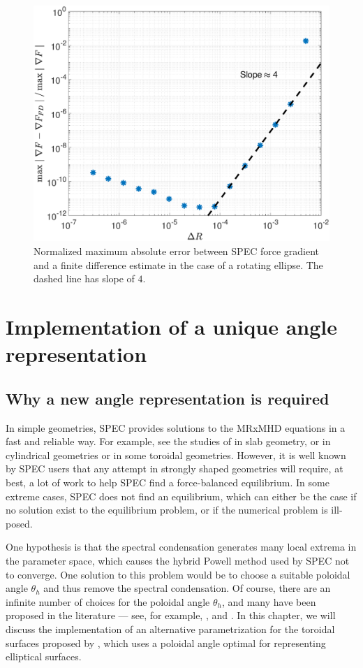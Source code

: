 \documentclass[my_thesis.tex]{subfiles}
\begin{document}
\begin{figure}
	\centering
	\includegraphics[width=.5\linewidth]{main/Figures_CurrentConstraint/ABaillod_fig10.pdf}
	\caption{Normalized maximum absolute error between \ac{SPEC} force gradient and a finite difference estimate in the case of a rotating ellipse. The dashed line has slope of $4$.} \label{fig:conv_FG_rotell}
\end{figure}


\section{Implementation of a unique angle representation \label{sec. angle representation}}

\subsection{Why a new angle representation is required}
In simple geometries, SPEC provides solutions to the MRxMHD equations in a fast and reliable way. For example, see the studies of \citet{Qu2021,Loizu2020} in slab geometry, or \citet{Kumar2021} in cylindrical geometries or \citet{Kumar2022} in some toroidal geometries. However, it is well known by SPEC users that any attempt in strongly shaped geometries will require, at best, a lot of work to help SPEC find a force-balanced equilibrium. In some extreme cases, SPEC does not find an equilibrium, which can either be the case if no solution exist to the equilibrium problem, or if the numerical problem is ill-posed. 


One hypothesis is that the spectral condensation generates many local extrema in the parameter space, which causes the hybrid Powell method used by SPEC not to converge. One solution to this problem would be to choose a suitable poloidal angle $\theta_h$ and thus remove the spectral condensation. Of course, there are an infinite number of choices for the poloidal angle $\theta_h$, and many have been proposed in the literature --- see, for example, \citet{hirshmanConvergentSpectralRepresentation1985}, \citet{hirshmanExplicitSpectrallyOptimized1998} and \citet{carlton-jonesComputingShapeGradient2021}. In this chapter, we will discuss the implementation of an alternative parametrization for the toroidal surfaces proposed by \citet{Henneberg2021}, which uses a poloidal angle optimal for representing elliptical surfaces. 
\end{document}
